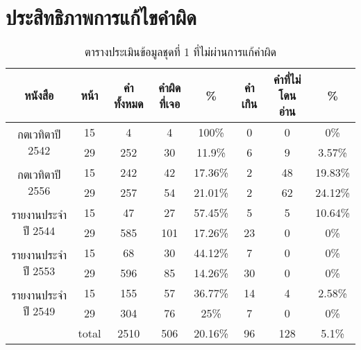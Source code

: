 \section{ประสิทธิภาพการแก้ไขคำผิด}
\begin{table}[H]
    \caption{ตารางประเมินข้อมูลชุดที่ 1 ที่ไม่ผ่านการแก้คำผิด}\label{tbl:correction}
    \begin{tabular}{|c|c|c|c|c|c|c|c|}
        \hline
        หนังสือ                             & หน้า                       & คำทั้งหมด & คำผิดที่เจอ & \%    & คำเกิน & คำที่ไม่โดนอ่าน & \%    \\ \hline
        \multirow{2}{*}{กตเวทิตาปี 2542}    & 15                         & 4         & 4           & 100\%   & 0      & 0               & 0\%     \\ \cline{2-8} 
                                            & 29                         & 252       & 30          & 11.9\%  & 6      & 9               & 3.57\%  \\ \hline
        \multirow{2}{*}{กตเวทิตาปี 2556}    & 15                         & 242       & 42          & 17.36\% & 2      & 48              & 19.83\% \\ \cline{2-8} 
                                            & 29                         & 257       & 54          & 21.01\% & 2      & 62              & 24.12\% \\ \hline
        \multirow{2}{*}{รายงานประจำปี 2544} & 15                         & 47        & 27          & 57.45\% & 5      & 5               & 10.64\% \\ \cline{2-8} 
                                            & 29                         & 585       & 101         & 17.26\% & 23     & 0               & 0\%     \\ \hline
        \multirow{2}{*}{รายงานประจำปี 2553} & 15                         & 68        & 30          & 44.12\% & 7      & 0               & 0\%     \\ \cline{2-8} 
                                            & 29                         & 596       & 85          & 14.26\% & 30     & 0               & 0\%     \\ \hline
        \multirow{2}{*}{รายงานประจำปี 2549} & 15                         & 155       & 57          & 36.77\% & 14     & 4               & 2.58\%  \\ \cline{2-8} 
                                            & 29                         & 304       & 76          & 25\%    & 7      & 0               & 0\%     \\ \hline
        \multicolumn{1}{|l|}{}              & \multicolumn{1}{l|}{total} & 2510      & 506         & 20.16\% & 96     & 128             & 5.1\%   \\ \hline
        \end{tabular}
        \end{table}

